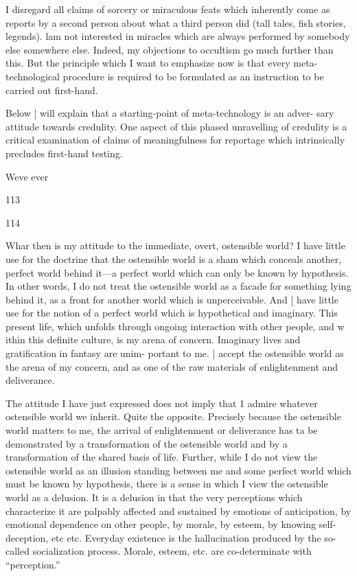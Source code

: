 I disregard all claims of sorcery or miraculous feats which inherently come as 
reports by a second person about what a third person did (tall tales, fish stories, 
legends). lam not interested in miracles which are always performed by somebody 
else somewhere else. Indeed, my objections to occultism go much further than this. 
But the principle which I want to emphasize now is that every meta-technological 
procedure is required to be formulated as an instruction to be carried out first-hand. 

Below | will explain that a starting-point of meta-technology is an adver- 
sary attitude towards credulity. One aspect of this phased unravelling of credulity 
is a critical examination of claims of meaningfulness for reportage which intrinsically 
precludes first-hand testing. 


Weve ever 


113 


114 


Whar then is my attitude to the immediate, overt, ostensible world? I have little 
use for the doctrine that the ostensible world is a sham which conceals another, 
perfect world behind it—a perfect world which can only be known by hypothesis. 
In other words, I do not treat the ostensible world as a facade for something lying 
behind it, as a front for another world which is unperceivable. And [ have little use 
for the notion of a perfect world which is hypothetical and imaginary. This present 
life, which unfolds through ongoing interaction with other people, and w ithin this definite 
culture, is my arena of concern. Imaginary lives and gratification in fantasy are unim- 
portant to me. | accept the ostensible world as the arena of my concern, and as one of the 
raw materials of enlightenment and deliverance. 

The attitude I have just expressed does not imply that 1 admire whatever 
ostensible world we inherit. Quite the opposite. Precisely because the ostensible world 
matters to me, the arrival of enlightenment or deliverance has ta be demonstrated by a 
transformation of the ostensible world and by a transformation of the shared basis of life. 
Further, while I do not view the ostensible world as an illusion standing between 
me and some perfect world which must be known by hypothesis, there is a sense in 
which I view the ostensible world as a delusion. It is a delusion in that the very 
perceptions which characterize it are palpably affected and sustained by emotions 
of anticipation, by emotional dependence on other people, by morale, by esteem, 
by knowing self-deception, etc etc. Everyday existence is the hallucination produced 
by the so-called socialization process. Morale, esteem, etc. are co-determinate with 
“perception.” 

